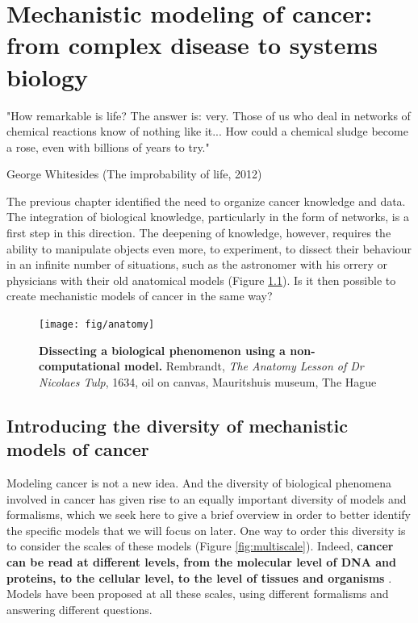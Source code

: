 \documentclass[a4paper,12pt,twoside,onecolumn,openright,final,oldfontcommands]{memoir}
\newcommand{\initial}[1]{
	\lettrine[lines=3,lhang=0.33,nindent=0em]{
		\color{gray}
     		{\textsc{#1}}}{}}
\begin{document}
\chapter{Mechanistic modeling of cancer: from complex disease to systems
biology}\label{mechanistic-cancer}

\epigraph{"How remarkable is life? The answer is: very. Those of us who deal in networks of chemical reactions know of nothing like it... How could a chemical sludge become a rose, even with billions of years to try."}{George Whitesides (The improbability of life, 2012)}

\initial{T}he previous chapter identified the need to organize cancer
knowledge and data. The integration of biological knowledge,
particularly in the form of networks, is a first step in this direction.
The deepening of knowledge, however, requires the ability to manipulate
objects even more, to experiment, to dissect their behaviour in an
infinite number of situations, such as the astronomer with his orrery or
physicians with their old anatomical models (Figure \ref{fig:anatomy}).
Is it then possible to create mechanistic models of cancer in the same
way?

\begin{figure}

{\centering \texttt{[image: fig/anatomy]} 

}

\caption[Dissecting a biological phenomenon using a non-computational model]{\textbf{Dissecting a biological phenomenon using a
non-computational model.} Rembrandt, \emph{The Anatomy Lesson of Dr
Nicolaes Tulp}, 1634, oil on canvas, Mauritshuis museum, The Hague}\label{fig:anatomy}
\end{figure}





\section{Introducing the diversity of mechanistic models of
cancer}\label{introducing-the-diversity-of-mechanistic-models-of-cancer}

Modeling cancer is not a new idea. And the diversity of biological
phenomena involved in cancer has given rise to an equally important
diversity of models and formalisms, which we seek here to give a brief
overview in order to better identify the specific models that we will
focus on later. One way to order this diversity is to consider the
scales of these models (Figure \ref{fig:multiscale}). Indeed,
\textbf{cancer can be read at different levels, from the molecular level
of DNA and proteins, to the cellular level, to the level of tissues and
organisms} \citep{anderson2008integrative}. Models have been proposed at
all these scales, using different formalisms
\citep{bellomo2008foundations} and answering different questions.
\end{document}
